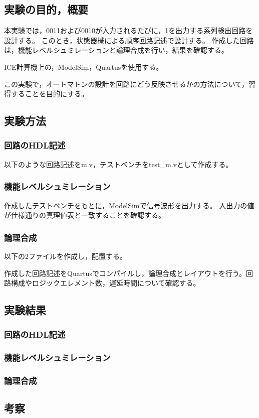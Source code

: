 
\subsection{実験の目的，概要}
本実験では，0011および0010が入力されるたびに，1を出力する系列検出回路を設計する。
このとき，状態器械による順序回路記述で設計する。
作成した回路は，機能レベルシュミレーションと論理合成を行い，結果を確認する。

ICE計算機上の，ModelSim，Quartusを使用する。

この実験で，オートマトンの設計を回路にどう反映させるかの方法について，習得することを目的にする。

\subsection{実験方法}
\subsubsection{回路のHDL記述}
以下のような回路記述をm.v，テストベンチをtest\_m.vとして作成する。



\subsubsection{機能レベルシュミレーション}
作成したテストベンチをもとに，ModelSimで信号波形を出力する。
入出力の値が仕様通りの真理値表と一致することを確認する。

\subsubsection{論理合成}
以下の2ファイルを作成し，配置する。



作成した回路記述をQuartusでコンパイルし，論理合成とレイアウトを行う。回路構成やロジックエレメント数，遅延時間について確認する。

\subsection{実験結果}
\subsubsection{回路のHDL記述}
\subsubsection{機能レベルシュミレーション}
\subsubsection{論理合成}
\subsection{考察}
